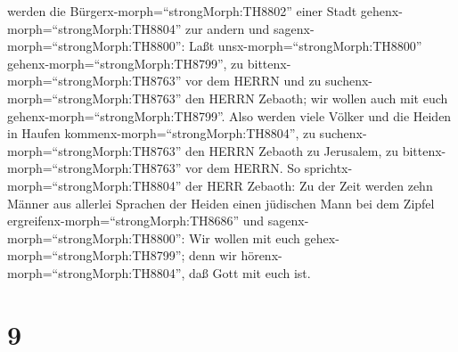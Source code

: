 werden die Bürgerx-morph=``strongMorph:TH8802'' einer Stadt
gehenx-morph=``strongMorph:TH8804'' zur andern und
sagenx-morph=``strongMorph:TH8800'': Laßt
unsx-morph=``strongMorph:TH8800'' gehenx-morph=``strongMorph:TH8799'',
zu bittenx-morph=``strongMorph:TH8763'' vor dem HERRN und zu
suchenx-morph=``strongMorph:TH8763'' den HERRN Zebaoth; wir wollen auch
mit euch gehenx-morph=``strongMorph:TH8799''.  Also werden
viele Völker und die Heiden in Haufen
kommenx-morph=``strongMorph:TH8804'', zu
suchenx-morph=``strongMorph:TH8763'' den HERRN Zebaoth zu Jerusalem, zu
bittenx-morph=``strongMorph:TH8763'' vor dem HERRN.  So
sprichtx-morph=``strongMorph:TH8804'' der HERR Zebaoth: Zu der Zeit
werden zehn Männer aus allerlei Sprachen der Heiden einen jüdischen Mann
bei dem Zipfel ergreifenx-morph=``strongMorph:TH8686'' und
sagenx-morph=``strongMorph:TH8800'': Wir wollen mit euch
gehex-morph=``strongMorph:TH8799''; denn wir
hörenx-morph=``strongMorph:TH8804'', daß Gott mit euch ist.

\hypertarget{section-8}{%
\section{9}\label{section-8}}

